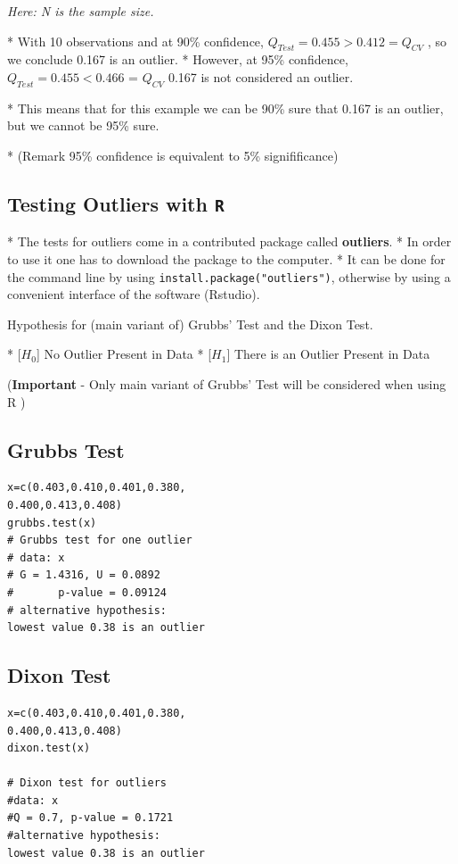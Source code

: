 \textit{Here: N is the sample size.}



* With 10 observations and at 90\% confidence, $Q_{Test} = 0.455 > 0.412 =Q_{CV}$ , so we conclude 0.167 is an outlier.
*   However, at 95\% confidence, $Q_{Test} = 0.455 < 0.466$ = $Q_{CV}$ 0.167 is not considered an outlier. 

*  This means that for this example we can be 90\% sure that 0.167 is an outlier, but we cannot be 95\% sure.

*  (Remark 95\% confidence is equivalent to 5\% signifificance)


\subsection{Testing Outliers with \texttt{R}}

*  The tests for outliers come in a contributed package called
\textbf{outliers}.
*  In order to use it one has to download the package to
the computer. 
*  It can be done for the command line by using
\texttt{install.package("outliers")}, otherwise by using a
convenient interface of the software (Rstudio).




Hypothesis for (main variant of) Grubbs' Test and the Dixon Test.


* [$H_0$] No Outlier Present in Data
* [$H_1$] There is an Outlier Present in Data


(\textbf{Important} - Only main variant of Grubbs' Test will be considered when using R )

\subsection{Grubbs Test}
\begin{framed}
\begin{verbatim}
x=c(0.403,0.410,0.401,0.380,
0.400,0.413,0.408)
grubbs.test(x)
# Grubbs test for one outlier
# data: x
# G = 1.4316, U = 0.0892
#       p-value = 0.09124
# alternative hypothesis: 
lowest value 0.38 is an outlier
\end{verbatim}
\end{framed}


\subsection{Dixon Test}
\begin{framed}
\begin{verbatim}
x=c(0.403,0.410,0.401,0.380,
0.400,0.413,0.408)
dixon.test(x)

# Dixon test for outliers
#data: x
#Q = 0.7, p-value = 0.1721
#alternative hypothesis: 
lowest value 0.38 is an outlier
\end{verbatim}
\end{framed}



